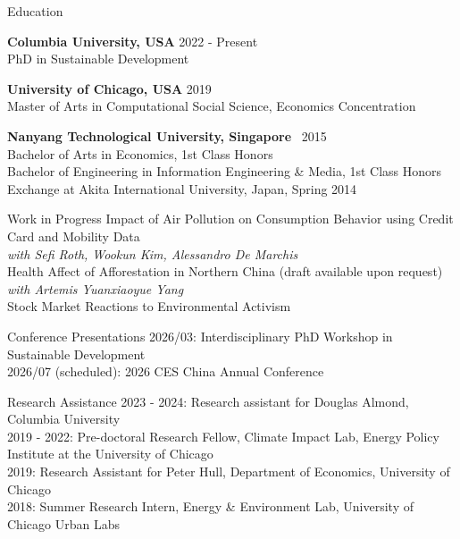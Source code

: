 \documentclass{resume} %
\begin{document}

\begin{rSection}{Education}

{\bf Columbia University, USA}\hfill{ 2022 - Present } 
\\ PhD in Sustainable Development  

{\bf University of Chicago, USA}\hfill{ 2019} 
\\ Master of Arts in Computational Social Science, Economics Concentration

{\bf Nanyang Technological University, Singapore } \hfill {\ 2015} 
\\Bachelor of Arts in Economics, 1st Class Honors 
\\Bachelor of Engineering in Information Engineering \& Media, 1st Class Honors 
\\ Exchange at Akita International University, Japan, Spring 2014
\end{rSection}

\begin{rSection}{Work in Progress}
Impact of Air Pollution on Consumption Behavior using Credit Card and Mobility Data \\ 
\textit{with Sefi Roth, Wookun Kim, Alessandro De Marchis} \\
Health Affect of Afforestation in Northern China (draft available upon request)\\
\textit{with Artemis Yuanxiaoyue Yang} \\
Stock Market Reactions to Environmental Activism 
\end{rSection}


\begin{rSection}{Conference Presentations}
2026/03: Interdisciplinary PhD Workshop in Sustainable Development \\
2026/07 (scheduled): 2026 CES China Annual Conference \\
\end{rSection}

\begin{rSection}{Research Assistance}
2023 - 2024:  Research assistant for Douglas Almond, Columbia University \\
2019 - 2022:  Pre-doctoral Research Fellow, Climate Impact Lab, Energy Policy Institute at the University of Chicago \\
2019:  Research Assistant for Peter Hull, Department of Economics, University of Chicago \\
2018: Summer Research Intern, Energy \& Environment Lab, University of Chicago Urban Labs


\end{rSection}
\end{document}
